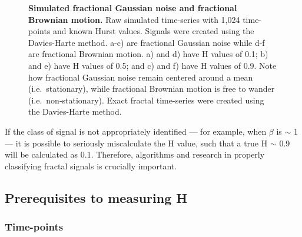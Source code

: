 \documentclass[
  sn-vancouver,
  Numbered,
  referee,
  lineno]{sn-jnl}
\begin{document}
\begin{figure}[H]


\caption{\label{fig-typicalsamplepaths}\textbf{Simulated fractional
Gaussian noise and fractional Brownian motion.} Raw simulated
time-series with 1,024 time-points and known Hurst values. Signals were
created using the Davies-Harte method. a-c) are fractional Gaussian
noise while d-f are fractional Brownian motion. a) and d) have H values
of 0.1; b) and e) have H values of 0.5; and c) and f) have H values of
0.9. Note how fractional Gaussian noise remain centered around a mean
(i.e.~stationary), while fractional Brownian motion is free to wander
(i.e.~non-stationary). Exact fractal time-series were created using the
Davies-Harte method.}

\end{figure}%

If the class of signal is not appropriately identified --- for example,
when \(\beta\) is \(\sim\) 1 --- it is possible to seriously
miscalculate the H value, such that a true H \(\sim\) 0.9 will be
calculated as 0.1. Therefore, algorithms and research in properly
classifying fractal signals is crucially important.

\subsection{Prerequisites to measuring
H}\label{prerequisites-to-measuring-h}

\subsubsection{Time-points}\label{time-points}
\end{document}
